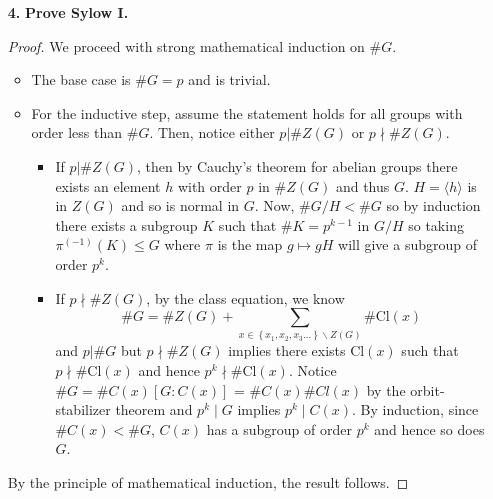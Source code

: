 \documentclass[letterpaper,12pt]{article}
\newcommand{\set}[1]{\left\{ #1 \right\}}
\begin{document}
\begin{enumerate}
    \item[\textbf{4.}] \textbf{Prove Sylow I.}
    \begin{proof}
       We proceed with strong mathematical induction on $\#G$. 
       \begin{itemize}
           \item The base case is $\# G = p$ and is trivial.
           \item For the inductive step, assume the statement holds for all groups with order less than $\# G$. Then, notice either $p|\#Z(G)$ or $p\nmid \#Z(G)$.
           \begin{itemize}
               \item If $p|\#Z(G)$, then by Cauchy's theorem for abelian groups there exists an element $h$ with order $p$ in $\#Z(G)$ and thus $G$. $H = \langle h \rangle$ is in $Z(G)$ and so is normal in $G$. Now, $\#G/H < \#G$ so by induction there exists a subgroup $K$ such that $\#K = p^{k-1}$ in $G/H$ so taking $\pi^(-1)(K)\leq G$ where $\pi$ is the map $g \mapsto gH$ will give a subgroup of order $p^k$.
               \item If $p\nmid \#Z(G)$, by the class equation, we know $$\# G = \#Z(G) + \sum_{x \in \set{x_1,x_2,x_3\ldots}\backslash Z(G)} \# \mathrm{Cl}(x)$$ and $p|\#G$ but $p\nmid \#Z(G)$ implies there exists $\mathrm{Cl}(x)$ such that $p\nmid \#\mathrm{Cl}(x)$ and hence $p^k\nmid \#\mathrm{Cl}(x)$. Notice $\#G = \#C(x)[G:C(x)]$ = $\#C(x)\#Cl(x)$ by the orbit-stabilizer theorem and $p^k \mid G$ implies $p^k \mid C(x)$. By induction, since $\#C(x) < \#G$, $C(x)$ has a subgroup of order $p^k$ and hence so does $G$.
           \end{itemize}
       \end{itemize}
        By the principle of mathematical induction, the result follows.
    \end{proof}
\end{enumerate}
\end{document}
